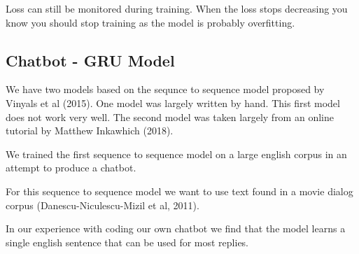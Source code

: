 Loss can still be monitored during training. When the loss stops decreasing you know you should stop training as the model is probably overfitting.

\subsection{Chatbot - GRU Model}
We have two models based on the sequnce to sequence model proposed by Vinyals et al (2015)\cite{DBLP:journals/corr/VinyalsL15}. One model was largely written by hand. This first model does not work very well. The second model was taken largely from an online tutorial by Matthew Inkawhich (2018)\cite{2018Inkawhich}.

We trained the first sequence to sequence model on a large english
corpus in an attempt to produce a chatbot. 

For this sequence to sequence model we want to use text found in a movie dialog corpus (Danescu-Niculescu-Mizil et al, 2011)\cite{Danescu-Niculescu-Mizil+Lee:11a}. 

In our experience with coding our own chatbot 
we find that the model learns a single english sentence that can be used for most replies. 

